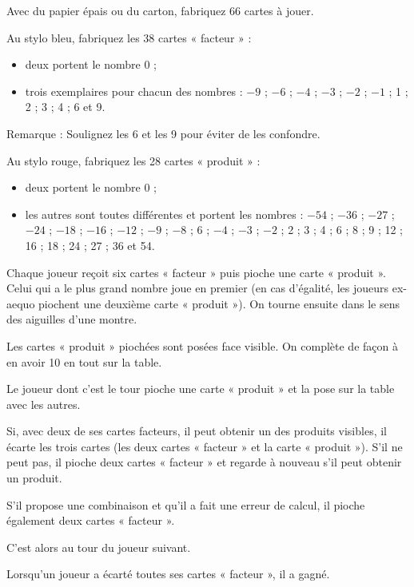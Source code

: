 \begin{TP}


Avec du papier épais ou du carton, fabriquez  66 cartes à jouer.

Au stylo bleu, fabriquez les 38 cartes « facteur » :
\begin{itemize}
\item deux portent le nombre 0 ;
\item trois exemplaires pour chacun des nombres : $-9$ ; $-6$ ; $-4$ ; $-3$ ; $-2$ ; $-1$ ; 1 ; 2 ; 3 ; 4 ; 6 et 9.
\end{itemize}

Remarque : Soulignez les 6 et les 9 pour éviter de les confondre.

Au stylo rouge, fabriquez les 28 cartes « produit » : 
\begin{itemize}
\item deux portent le nombre 0 ;
\item les autres sont toutes différentes et portent les nombres : $-54$ ; $-36$ ; $-27$ ; $-24$ ; $-18$ ; $-16$ ; $-12$ ; $-9$ ; $-8$ ; 6 ; $-4$ ; $-3$ ; $-2$ ; 2 ; 3 ; 4 ; 6 ; 8 ; 9 ; 12 ; 16 ; 18 ; 24 ; 27 ; 36 et 54.
\end{itemize}


Chaque joueur reçoit six cartes « facteur » puis pioche une carte « produit ». Celui qui a le plus grand nombre joue en premier (en cas d'égalité, les joueurs ex-aequo piochent une deuxième carte « produit »). On tourne ensuite dans le sens des aiguilles d'une montre.

Les cartes « produit » piochées sont posées face visible. On complète de façon à en avoir 10 en tout sur la table.

Le joueur dont c'est le tour pioche une carte « produit » et la pose sur la table avec les autres. 

Si, avec deux de ses cartes facteurs, il peut obtenir un des produits visibles, il écarte les trois cartes (les deux cartes « facteur » et la carte « produit »).
S'il ne peut pas, il pioche deux cartes « facteur » et regarde à nouveau s'il peut obtenir un produit.

S'il propose une combinaison et qu'il a fait une erreur de calcul, il pioche également deux cartes « facteur ».

C'est alors au tour du joueur suivant.

Lorsqu'un joueur a écarté toutes ses cartes « facteur », il a gagné.

\end{TP}

